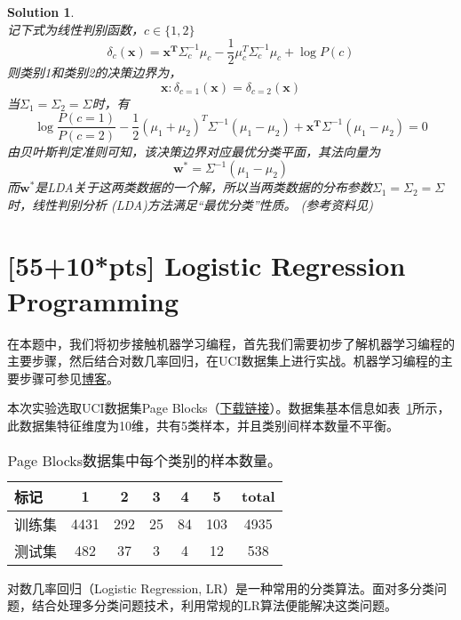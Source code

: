 \documentclass[a4paper,UTF8]{article}
\numberwithin{equation}{section}
\newtheorem*{solution}{Solution}
\begin{document}
\begin{solution}
\[\]
记下式为线性判别函数，$c \in \{1,2\}$
\[
    \delta_c(\bm{x}) = \bm{x^T}\Sigma_c^{-1}\mu_c - \frac{1}{2}\mu_c^T\Sigma_c^{-1}\mu_c+\log P(c)
\]
则类别1和类别2的决策边界为，
\[
    {\bm{x}: \delta_{c=1}(\bm{x}) = \delta_{c=2}(\bm{x})}
\]
当$\Sigma_1=\Sigma_2=\Sigma$时，有
\[
    \log \frac{P(c=1)}{P(c=2)} - \frac{1}{2}(\mu_1+\mu_2)^T\Sigma^{-1}(\mu_1-\mu_2)+\bm{x^T}\Sigma^{-1}(\mu_1-\mu_2)=0
\]
由贝叶斯判定准则可知，该决策边界对应最优分类平面，其法向量为
\[
    \bm{w^*} = \Sigma^{-1}(\mu_1-\mu_2)
\]
而$\bm{w^*}$是LDA关于这两类数据的一个解，所以当两类数据的分布参数$\Sigma_1=\Sigma_2=\Sigma$时，线性判别分析 (LDA)方法满足“最优分类”性质。
(参考资料见\cite{ref2})
\end{solution}
\newpage



\section{[55+10*pts] Logistic Regression Programming}
在本题中，我们将初步接触机器学习编程，首先我们需要初步了解机器学习编程的主要步骤，然后结合对数几率回归，在UCI数据集上进行实战。机器学习编程的主要步骤可参见\href{http://blog.csdn.net/cqy_chen/article/details/78690975}{博客}。

本次实验选取UCI数据集Page Blocks（\href{http://lamda.nju.edu.cn/ml2018/PS2/PS2_dataset.zip}{下载链接}）。数据集基本信息如表~\ref{data_inf}所示，此数据集特征维度为10维，共有5类样本，并且类别间样本数量不平衡。

\begin{table}[!h]
	\centering
	\caption{Page Blocks数据集中每个类别的样本数量。}\vspace{3mm}
	\label{data_inf}
	\begin{tabular}{l|cccccc}\hline
		标记     & 1    & 2   & 3  & 4  & 5   & total \\ \hline
		训练集   & 4431 & 292 & 25 & 84 & 103 & 4935  \\
		测试集   & 482  & 37  & 3  & 4  & 12  & 538   \\ \hline
	\end{tabular}
\end{table}

对数几率回归（Logistic Regression, LR）是一种常用的分类算法。面对多分类问题，结合处理多分类问题技术，利用常规的LR算法便能解决这类问题。
\end{document}
